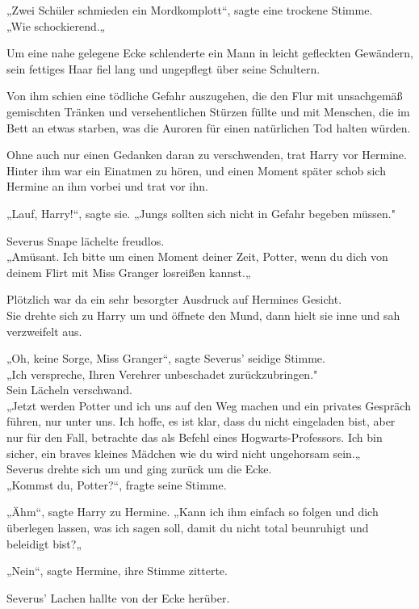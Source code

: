{„Zwei Schüler schmieden ein Mordkomplott“, sagte eine trockene Stimme.\\ „Wie schockierend.„

Um eine nahe gelegene Ecke schlenderte ein Mann in leicht gefleckten Gewändern, sein fettiges Haar fiel lang und ungepflegt über seine Schultern.

Von ihm schien eine tödliche Gefahr auszugehen, die den Flur mit unsachgemäß gemischten Tränken und versehentlichen Stürzen füllte und mit Menschen, die im Bett an etwas starben, was die Auroren für einen natürlichen Tod halten würden.

Ohne auch nur einen Gedanken daran zu verschwenden, trat Harry vor Hermine. Hinter ihm war ein Einatmen zu hören, und einen Moment später schob sich Hermine an ihm vorbei und trat vor ihn.

„Lauf, Harry!“, sagte sie. „Jungs sollten sich nicht in Gefahr begeben müssen."

Severus Snape lächelte freudlos.\\ „Amüsant. Ich bitte um einen Moment deiner Zeit, Potter, wenn du dich von deinem Flirt mit Miss Granger losreißen kannst.„

Plötzlich war da ein sehr besorgter Ausdruck auf Hermines Gesicht.\\ Sie drehte sich zu Harry um und öffnete den Mund, dann hielt sie inne und sah verzweifelt aus.

„Oh, keine Sorge, Miss Granger“, sagte Severus' seidige Stimme.\\ „Ich verspreche, Ihren Verehrer unbeschadet zurückzubringen."\\ Sein Lächeln verschwand.\\ „Jetzt werden Potter und ich uns auf den Weg machen und ein privates Gespräch führen, nur unter uns. Ich hoffe, es ist klar, dass du nicht eingeladen bist, aber nur für den Fall, betrachte das als Befehl eines Hogwarts-Professors. Ich bin sicher, ein braves kleines Mädchen wie du wird nicht ungehorsam sein.„\\ Severus drehte sich um und ging zurück um die Ecke.\\ „Kommst du, Potter?“, fragte seine Stimme.

„Ähm“, sagte Harry zu Hermine. „Kann ich ihm einfach so folgen und dich überlegen lassen, was ich sagen soll, damit du nicht total beunruhigt und beleidigt bist?„

„Nein“, sagte Hermine, ihre Stimme zitterte.

Severus' Lachen hallte von der Ecke herüber.

}
